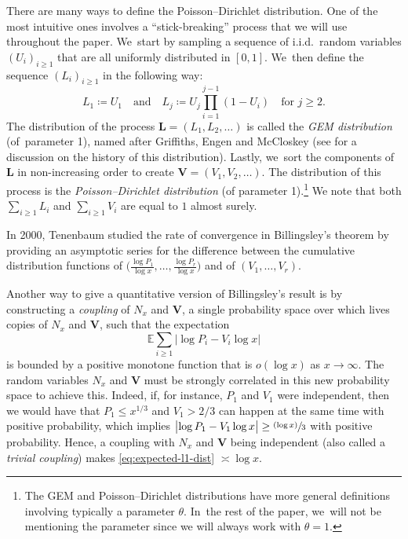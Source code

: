 \documentclass[JEP,XML,SOM,Unicode,published]{cedram}
\newcommand{\bL}{{\boldsymbol L}}
\newcommand{\bV}{{\boldsymbol V}}
\newcommand{\psfrac}[2]{\sfrac{(#1)}{#2}}
\newcommand{\EE}{\mathbb{E}}
\newcommand{\bg}{\big}
\theoremstyle{plain}
\theoremstyle{definition}
\begin{document}
There are many ways to define the Poisson--Dirichlet distribution. One of the most intuitive ones involves a ``stick-breaking'' process that we will use throughout the paper. We~start by sampling a sequence of i.i.d.~random variables $(U_i)_{i \ge 1}$ that are all uniformly distributed in $[0, 1]$. We~then define the sequence $(L_i)_{i \ge 1}$ in the following way:
\[
L_1 \coloneqq U_1 \quad \text{and}\quad L_j \coloneqq U_j \prod_{i=1}^{j-1} (1-U_i) \quad \text{for $j \ge 2$.}
\]
The distribution of the process $\bL = (L_1, L_2, \ldots)$ is called the \textit{GEM distribution} (of~parameter 1), named after Griffiths, Engen and McCloskey (see \cite[Ch.\,41]{JKB} for a discussion on the history of this distribution). Lastly, we~sort the components of $\bL$ in non-increasing order to create $\bV = (V_1, V_2, \ldots)$. The distribution of this process is the \textit{Poisson--Dirichlet distribution} (of parameter 1).\footnote{The GEM and Poisson--Dirichlet distributions have more general definitions involving typically a parameter $\theta$. In~the rest of the paper, we~will not be mentioning the parameter since we will always work with $\theta = 1$.} We note that both $\sum_{i \ge 1} L_i$ and $\sum_{i \ge 1} V_i$ are equal to $1$ almost surely.

In 2000, Tenenbaum \cite{Tenenbaum00} studied the rate of convergence in Billingsley's theorem by providing an asymptotic series for the difference between the cumulative distribution functions of $\bg(\tfrac{\log P_1}{\log x}, \ldots, \tfrac{\log P_r}{\log x}\bg)$ and of $(V_1, \ldots, V_r)$.

Another way to give a quantitative version of Billingsley's result is by constructing a \emph{coupling} of $N_x$ and $\bV$, \ie a single probability space over which lives copies of $N_x$ and $\bV$, such that the expectation
\begin{equation}
\label{eq:expected-l1-dist}
\EE\sum_{i \ge 1} \bg|{\log P_i - V_i\log x}\bg|
\end{equation}
is bounded by a positive monotone function that is $o(\log x)$ as $x \to \infty$. The random variables $N_x$ and $\bV$ must be strongly correlated in this new probability space to achieve this. Indeed, if, for instance, $P_1$ and $V_1$ were independent, then we would have that $P_1\le x^{1/3}$ and $V_1>2/3$ can happen at the same time with positive probability, which implies $\bg|{\log P_1 - V_1\log x}\bg| \ge \psfrac{\log x}{3}$ with positive probability. Hence, a coupling with $N_x$ and $\bV$ being independent (also called a \emph{trivial coupling}) makes \eqref{eq:expected-l1-dist} $\asymp \log x$.
\end{document}
